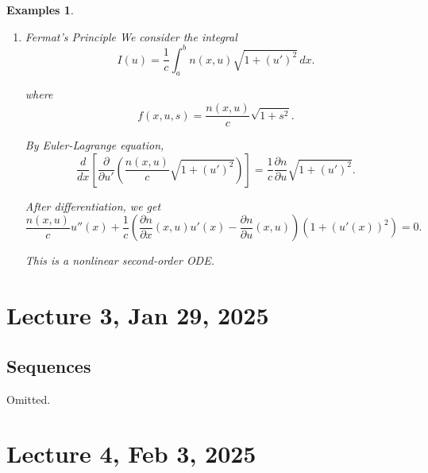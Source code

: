 \documentclass[12pt]{report}
\newtheorem{examples}{Examples}[section]
\begin{document}
\begin{examples}
\begin{enumerate}
Example:
\[ a = 1, \quad b = 1, \quad \alpha = \beta = 2. \]

\[ 2 = \frac{\mu}{2\pi} \cosh\left(\frac{2\pi}{\mu} (c + 1)\right) \Rightarrow c = 0. \]

\[ 2 = \frac{\mu}{2\pi} \cosh\left(\frac{2\pi}{\mu} (c + 1)\right). \]

\[ 4\pi = \mu \cosh\left(\frac{2\pi}{\mu}\right). \]

Numerics lead to two roots:
\[ \mu_1 \approx 2.954, \quad \mu_2 \approx 10.661. \]

Which value(s) give the global minimum?

Check:
\[
\begin{aligned}
    u_1(x) &= \frac{\mu_1}{2\pi} \cosh\left(\frac{2\pi}{\mu_1} x\right) \Rightarrow I(u_1) = 22.3878, \\
    u_2(x) &= \frac{\mu_2}{2\pi} \cosh\left(\frac{2\pi}{\mu_2} x\right) \Rightarrow I(u_2) = 23.968.
\end{aligned}
\]
\item Fermat's Principle
We consider the integral
\[ I(u) = \frac{1}{c} \int_a^b n(x,u) \sqrt{1+(u')^2} \, dx. \]

where
\[ f(x,u,s) = \frac{n(x,u)}{c} \sqrt{1+s^2}. \]

By Euler-Lagrange equation, 
\[ \frac{d}{dx} \left[ \frac{\partial}{\partial u'} \left( \frac{n(x,u)}{c} \sqrt{1+(u')^2} \right) \right] = \frac{1}{c} \frac{\partial n}{\partial u} \sqrt{1+(u')^2}. \]

After differentiation, we get
\[ \frac{n(x,u)}{c} u''(x) + \frac{1}{c} \left( \frac{\partial n}{\partial x} (x,u) u'(x) - \frac{\partial n}{\partial u} (x,u) \right) \left( 1+(u'(x))^2 \right) = 0. \]

This is a nonlinear second-order ODE.

\end{enumerate}
\end{examples}
\section{Lecture 3, Jan 29, 2025}
\subsection{Sequences}
Omitted. 
\section{Lecture 4, Feb 3, 2025}
\end{document}
